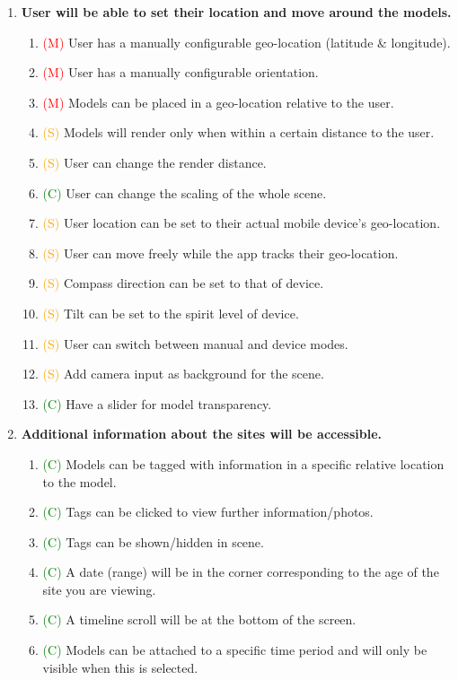\documentclass{article}
\newcommand{\must}[1]{\textcolor{red}{#1}}
\newcommand{\should}[1]{\textcolor{orange}{#1}}
\newcommand{\could}[1]{\textcolor{green}{#1}}
\begin{document}
\begin{enumerate}[label=\Roman*.]
\item \textbf{User will be able to set their location and move around the models.}
    \begin{enumerate}[label=\arabic*.]
    \item \must{(M)} User has a manually configurable geo-location (latitude \& longitude).
    \item \must{(M)} User has a manually configurable orientation.
    \item \must{(M)} Models can be placed in a geo-location relative to the user.
    \item \should{(S)} Models will render only when within a certain distance to the user.
    \item \should{(S)} User can change the render distance.
    \item \could{(C)} User can change the scaling of the whole scene.
    \item \should{(S)} User location can be set to their actual mobile device's geo-location.
    \item \should{(S)} User can move freely while the app tracks their geo-location.
    \item \should{(S)} Compass direction can be set to that of device.
    \item \should{(S)} Tilt can be set to the spirit level of device.
    \item \should{(S)} User can switch between manual and device modes.
    \item \should{(S)} Add camera input as background for the scene.
    \item \could{(C)} Have a slider for model transparency.
    \end{enumerate}
    
\item \textbf{Additional information about the sites will be accessible.}
    \begin{enumerate}[label=\arabic*.]
    \item \could{(C)} Models can be tagged with information in a specific relative location to the model.
    \item \could{(C)} Tags can be clicked to view further information/photos.
    \item \could{(C)} Tags can be shown/hidden in scene.
    \item \could{(C)} A date (range) will be in the corner corresponding to the age of the site you are viewing.
    \item \could{(C)} A timeline scroll will be at the bottom of the screen.
    \item \could{(C)} Models can be attached to a specific time period and will only be visible when this is selected.
    \end{enumerate}


\end{enumerate}
\end{document}
